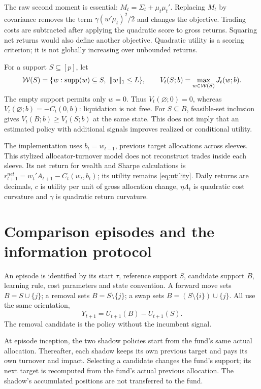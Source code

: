 \documentclass[11pt,a4paper]{article}
\theoremstyle{remark}\newtheorem{remark}[theorem]{Remark}
\newcommand{\norm}[1]{\lVert#1\rVert}\newcommand{\pos}[1]{[#1]_+}
\newcommand{\supp}{\operatorname{supp}}\newcommand{\op}{\mathrm{op}}
\begin{document}
The raw second moment is essential: $M_t=\Sigma_t+\mu_t\mu_t'$.
Replacing $M_t$ by covariance removes the term
$\gamma(w'\mu_t)^2/2$ and changes the objective. Trading costs are subtracted
after applying the quadratic score to gross returns. Squaring net returns
would also define another objective. Quadratic utility is a scoring criterion;
it is not globally increasing over unbounded returns.

For a support $S\subseteq[p]$, let
\begin{equation}
 \W(S)=\{w:\supp(w)\subseteq S,\ \norm w_1\le L\},\qquad
 V_t(S;b)=\max_{w\in\W(S)}J_t(w;b).
\end{equation}
The empty support permits only $w=0$. Thus $V_t(\varnothing;0)=0$, whereas
$V_t(\varnothing;b)=-C_t(0,b)$: liquidation is not free. For $S\subseteq B$,
feasible-set inclusion gives $V_t(B;b)\ge V_t(S;b)$ at the same state.
This does not imply that an estimated policy with additional signals improves
realized or conditional utility.

The implementation uses $b_t=w_{t-1}$, previous target allocations across
sleeves. This stylized allocator-turnover model does not reconstruct trades
inside each sleeve. Its net return for wealth and Sharpe calculations is
$r^{net}_{t+1}=w_t'A_{t+1}-C_t(w_t,b_t)$; its utility remains
\eqref{eq:utility}. Daily returns are decimals, $c$ is utility per unit of
gross allocation change, $\eta\Lambda_t$ is quadratic cost curvature and
$\gamma$ is quadratic return curvature.

\section{Comparison episodes and the information protocol}
An episode is identified by its start $\tau$, reference support $S$, candidate
support $B$, learning rule, cost parameters and state convention. A forward
move sets $B=S\cup\{j\}$; a removal sets $B=S\setminus\{j\}$; a swap sets
$B=(S\setminus\{i\})\cup\{j\}$. All use the same orientation,
\begin{equation}
 Y_{t+1}=U_{t+1}(B)-U_{t+1}(S).\label{eq:score}
\end{equation}
The removal candidate is the policy without the incumbent signal.

At episode inception, the two shadow policies start from the fund's same
actual allocation. Thereafter, each shadow keeps its own previous target and
pays its own turnover and impact. Selecting a candidate changes the fund's
support; its next target is recomputed from the fund's actual previous
allocation. The shadow's accumulated positions are not transferred to the fund.
\end{document}
